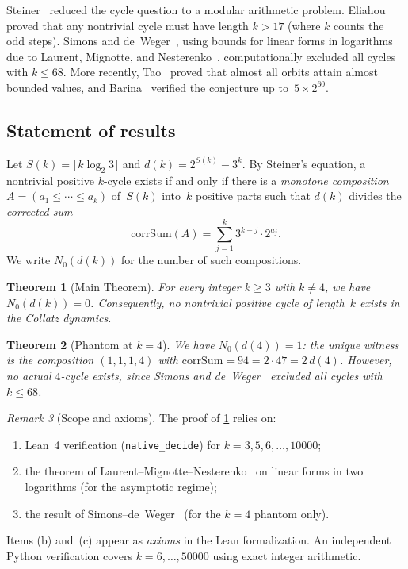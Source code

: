 \documentclass[11pt, a4paper]{amsart}
\theoremstyle{plain}
\newtheorem{theorem}{Theorem}[section]
\theoremstyle{definition}
\theoremstyle{remark}
\newtheorem{remark}[theorem]{Remark}
\newcommand{\corrSum}{\mathrm{corrSum}}
\begin{document}
Steiner~\cite{Steiner1977} reduced the cycle question to a modular
arithmetic problem.  Eliahou~\cite{Eliahou1993} proved that any
nontrivial cycle must have length $k > 17$ (where $k$ counts the odd
steps).  Simons and de~Weger~\cite{SimonsDeWeger2005}, using bounds for
linear forms in logarithms due to Laurent, Mignotte, and
Nesterenko~\cite{LMN1995}, computationally excluded all cycles with
$k \leq 68$.  More recently, Tao~\cite{Tao2022} proved that almost all
orbits attain almost bounded values, and Barina~\cite{Barina2021}
verified the conjecture up to~$5 \times 2^{60}$.

\subsection{Statement of results}\label{ssec:results}

Let $S(k) = \lceil k \log_2 3 \rceil$ and $d(k) = 2^{S(k)} - 3^k$.
By Steiner's equation, a nontrivial positive $k$-cycle exists if and only
if there is a \emph{monotone composition}~$A = (a_1 \leq \cdots \leq a_k)$
of~$S(k)$ into~$k$ positive parts such that $d(k)$ divides the
\emph{corrected sum}
\begin{equation}\label{eq:corrsum}
  \corrSum(A) = \sum_{j=1}^{k} 3^{k-j} \cdot 2^{a_j}.
\end{equation}
We write $N_0(d(k))$ for the number of such compositions.

\begin{theorem}[Main Theorem]\label{thm:main}
  For every integer $k \geq 3$ with $k \neq 4$, we have
  $N_0(d(k)) = 0$.  Consequently, no nontrivial positive cycle of
  length~$k$ exists in the Collatz dynamics.
\end{theorem}

\begin{theorem}[Phantom at $k=4$]\label{thm:phantom}
  We have $N_0(d(4)) = 1$: the unique witness is the composition
  $(1,1,1,4)$ with $\corrSum = 94 = 2 \cdot 47 = 2\,d(4)$.
  However, no actual $4$-cycle exists, since Simons and
  de~Weger~\cite{SimonsDeWeger2005} excluded all cycles with
  $k \leq 68$.
\end{theorem}

\begin{remark}[Scope and axioms]\label{rem:scope}
  The proof of \cref{thm:main} relies on:
  \begin{enumerate}[label=(\alph*)]
    \item Lean~4 verification (\texttt{native\_decide}) for
          $k = 3, 5, 6, \ldots, 10000$;
    \item the theorem of Laurent--Mignotte--Nesterenko~\cite{LMN1995}
          on linear forms in two logarithms (for the asymptotic regime);
    \item the result of Simons--de~Weger~\cite{SimonsDeWeger2005}
          (for the $k=4$ phantom only).
  \end{enumerate}
  Items (b) and~(c) appear as \emph{axioms} in the Lean formalization.
  An independent Python verification covers $k = 6, \ldots, 50000$
  using exact integer arithmetic.
\end{remark}
\end{document}
